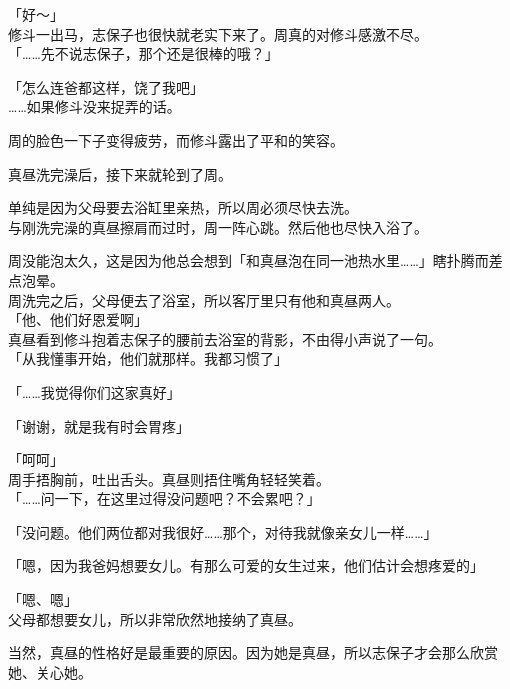 「好～」\\

修斗一出马，志保子也很快就老实下来了。周真的对修斗感激不尽。\\

「……先不说志保子，那个还是很棒的哦？」

「怎么连爸都这样，饶了我吧」\\

……如果修斗没来捉弄的话。

周的脸色一下子变得疲劳，而修斗露出了平和的笑容。\\

\vspace{2\baselineskip}

真昼洗完澡后，接下来就轮到了周。

单纯是因为父母要去浴缸里亲热，所以周必须尽快去洗。\\

与刚洗完澡的真昼擦肩而过时，周一阵心跳。然后他也尽快入浴了。

周没能泡太久，这是因为他总会想到「和真昼泡在同一池热水里……」瞎扑腾而差点泡晕。\\

周洗完之后，父母便去了浴室，所以客厅里只有他和真昼两人。\\

「他、他们好恩爱啊」\\

真昼看到修斗抱着志保子的腰前去浴室的背影，不由得小声说了一句。\\

「从我懂事开始，他们就那样。我都习惯了」

「……我觉得你们这家真好」

「谢谢，就是我有时会胃疼」

「呵呵」\\

周手捂胸前，吐出舌头。真昼则捂住嘴角轻轻笑着。\\

「……问一下，在这里过得没问题吧？不会累吧？」

「没问题。他们两位都对我很好……那个，对待我就像亲女儿一样……」

「嗯，因为我爸妈想要女儿。有那么可爱的女生过来，他们估计会想疼爱的」

「嗯、嗯」\\

父母都想要女儿，所以非常欣然地接纳了真昼。

当然，真昼的性格好是最重要的原因。因为她是真昼，所以志保子才会那么欣赏她、关心她。\\

